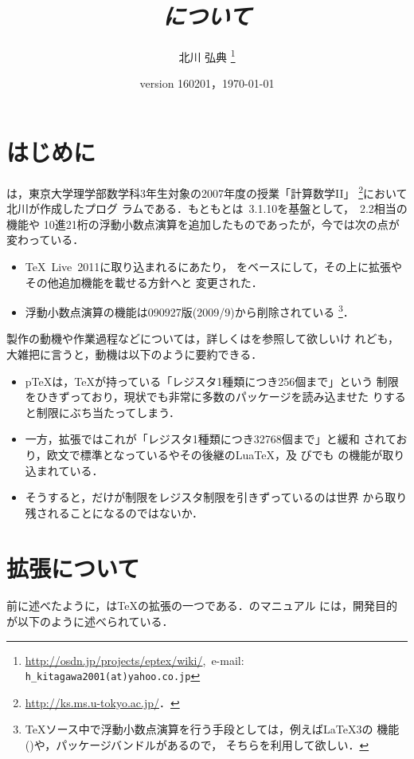 \documentclass[a4paper,11pt]{jsarticle}
\begin{document}
\title{\emph{\epTeX について}}
\author{北川 弘典\null
\thanks{\url{http://osdn.jp/projects/eptex/wiki/},\ 
e-mail: \texttt{h\_kitagawa2001(at)yahoo.co.jp}}}
\date{version 160201，\today}
\maketitle

\tableofcontents

\section{はじめに}
\epTeX は，東京大学理学部数学科3年生対象の2007年度の授業「計算数学II」
\footnote{\url{http://ks.ms.u-tokyo.ac.jp/}．}において北川が作成したプログ
ラムである．もともとは\pTeX\ 3.1.10を基盤として，\eTeX\ 2.2相当の機能や
10進21桁の浮動小数点演算を追加したものであったが，今では次の点が変わっている．
\begin{itemize}
  \item \TeX~Live~2011に取り込まれるにあたり，
  \eTeX をベースにして，その上に\pTeX 拡張やその他追加機能を載せる方針へと
  変更された．
  \item 浮動小数点演算の機能は090927版(2009/9)から削除されている
  \footnote{%
  \TeX ソース中で浮動小数点演算を行う手段としては，例えば\LaTeX3の
  機能()や，パッケージバンドルがあるので，
  そちらを利用して欲しい．}．
\end{itemize}

製作の動機や作業過程などについては，詳しくは\cite{h7k}を参照して欲しいけ
れども，大雑把に言うと，動機は以下のように要約できる．
\begin{itemize}
\item p\TeX は，\TeX が持っている「レジスタ1種類につき256個まで」という
      制限をひきずっており，現状でも非常に多数のパッケージを読み込ませた
      りすると制限にぶち当たってしまう．
\item 一方，\eTeX 拡張ではこれが「レジスタ1種類につき32768個まで」と緩和
      されており，欧文で標準となっている\pdfTeX やその後継のLua\TeX，及
      び\XeTeX でも
      \eTeX の機能が取り込まれている．
\item そうすると，\pTeX だけが制限をレジスタ制限を引きずっているのは世界
      から取り残されることになるのではないか．
\end{itemize}
\indent

\section{\eTeX 拡張について}
前に述べたように，\eTeX は\TeX の拡張の一つである．\eTeX のマニュアル
\cite{etexman}には，開発目的が以下のように述べられている．
\end{document}
